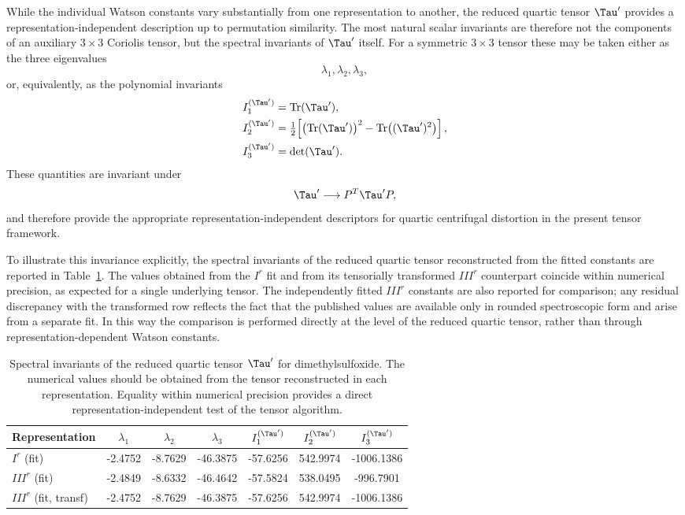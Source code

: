 While the individual Watson constants vary substantially from one
representation to another, the reduced quartic tensor $\Tau'$ provides
a representation-independent description up to permutation similarity.
The most natural scalar invariants are therefore not the components of
an auxiliary $3\times 3$ Coriolis tensor, but the spectral invariants
of $\Tau'$ itself.  For a symmetric $3\times 3$ tensor these may be
taken either as the three eigenvalues
\[
\lambda_1,\lambda_2,\lambda_3,
\]
or, equivalently, as the polynomial invariants
\begin{align}
I_1^{(\Tau')} &= \mathrm{Tr}(\Tau'),\\
I_2^{(\Tau')} &= \tfrac12\!\left[
\bigl(\mathrm{Tr}(\Tau')\bigr)^2-\mathrm{Tr}\bigl((\Tau')^2\bigr)
\right],\\
I_3^{(\Tau')} &= \det(\Tau').
\end{align}
These quantities are invariant under
\[
\Tau' \longrightarrow P^T \Tau' P,
\]
and therefore provide the appropriate representation-independent
descriptors for quartic centrifugal distortion in the present tensor
framework.

To illustrate this invariance explicitly, the spectral invariants of
the reduced quartic tensor reconstructed from the fitted constants are
reported in Table~\ref{tab:DMSO_tauprime}.  The values obtained from
the $I^r$ fit and from its tensorially transformed $III^r$
counterpart coincide within numerical precision, as expected for a
single underlying tensor. The independently fitted $III^r$ constants
are also reported for comparison; any residual discrepancy with the
transformed row reflects the fact that the published values are
available only in rounded spectroscopic form and arise from a
separate fit.  In this way the comparison is performed directly at the
level of the reduced quartic tensor, rather than through
representation-dependent Watson constants.

\begin{table}[h]
\centering
\caption{Spectral invariants of the reduced quartic tensor $\Tau'$ for
dimethylsulfoxide.  The numerical values should be obtained from the
tensor reconstructed in each representation.  Equality within
numerical precision provides a direct representation-independent test
of the tensor algorithm.}

\begin{tabular}{lcccccc}
\hline
Representation & $\lambda_1$ & $\lambda_2$ & $\lambda_3$ & $I_1^{(\Tau')}$ & $I_2^{(\Tau')}$ & $I_3^{(\Tau')}$ \\
\hline
$I^r$ (fit) & -2.4752 & -8.7629 & -46.3875 & -57.6256 & 542.9974 & -1006.1386 \\
$III^r$ (fit) & -2.4849 & -8.6332 & -46.4642 & -57.5824 & 538.0495 & -996.7901 \\
$III^r$ (fit, transf) & -2.4752 & -8.7629 & -46.3875 & -57.6256 & 542.9974 & -1006.1386 \\
\hline
\end{tabular}

\label{tab:DMSO_tauprime}
\end{table}

